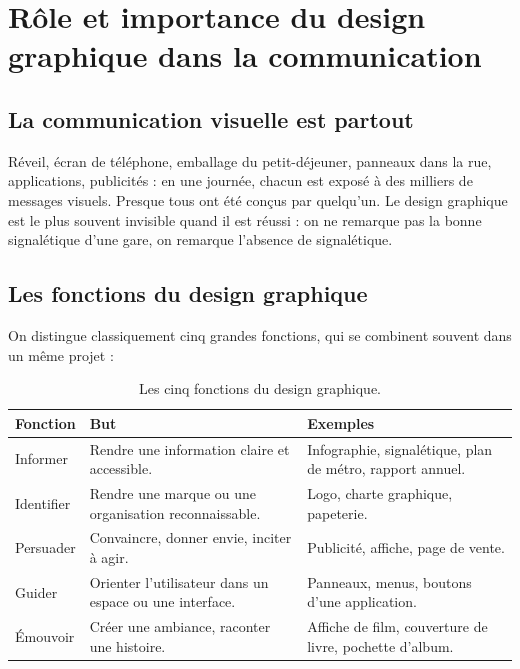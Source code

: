 \section{Rôle et importance du design graphique dans la communication}

\subsection{La communication visuelle est partout}

Réveil, écran de téléphone, emballage du petit-déjeuner, panneaux dans la rue, applications, publicités : en une journée, chacun est exposé à des milliers de messages visuels. Presque tous ont été conçus par quelqu'un. Le design graphique est le plus souvent invisible quand il est réussi : on ne remarque pas la bonne signalétique d'une gare, on remarque l'absence de signalétique.

\subsection{Les fonctions du design graphique}

On distingue classiquement cinq grandes fonctions, qui se combinent souvent dans un même projet :

\begin{table}[h!]
\centering
\begin{tabular}{@{}p{3cm}p{5.2cm}p{5.8cm}@{}}
\toprule
\textbf{Fonction} & \textbf{But} & \textbf{Exemples} \\
\midrule
Informer & Rendre une information claire et accessible. & Infographie, signalétique, plan de métro, rapport annuel. \\
Identifier & Rendre une marque ou une organisation reconnaissable. & Logo, charte graphique, papeterie. \\
Persuader & Convaincre, donner envie, inciter à agir. & Publicité, affiche, page de vente. \\
Guider & Orienter l'utilisateur dans un espace ou une interface. & Panneaux, menus, boutons d'une application. \\
Émouvoir & Créer une ambiance, raconter une histoire. & Affiche de film, couverture de livre, pochette d'album. \\
\bottomrule
\end{tabular}
\caption{Les cinq fonctions du design graphique.}
\end{table}

